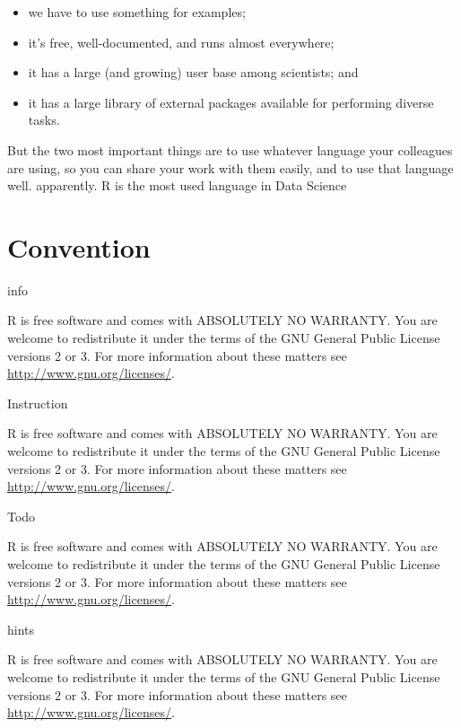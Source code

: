 \documentclass[
]{book}
\makeatletter
\providecommand{\tightlist}{%
  \setlength{\itemsep}{0pt}\setlength{\parskip}{0pt}}
\newenvironment{kframe}{%
\medskip{}
\setlength{\fboxsep}{.8em}
 \def\at@end@of@kframe{}%
 \ifinner\ifhmode%
  \def\at@end@of@kframe{\end{minipage}}%
  \begin{minipage}{\columnwidth}%
 \fi\fi%
 \def\FrameCommand##1{\hskip\@totalleftmargin \hskip-\fboxsep
 \colorbox{shadecolor}{##1}\hskip-\fboxsep
     \hskip-\linewidth \hskip-\@totalleftmargin \hskip\columnwidth}%
 \MakeFramed {\advance\hsize-\width
   \@totalleftmargin\z@ \linewidth\hsize
   \@setminipage}}%
 {\par\unskip\endMakeFramed%
 \at@end@of@kframe}
\newenvironment{rmdblock}[1]
  {
  \begin{itemize}
  \renewcommand{\labelitemi}{
    \raisebox{-.7\height}[0pt][0pt]{
      {\setkeys{Gin}{width=3em,keepaspectratio}\texttt{[image: images/\#1]}}
    }
  }
  \setlength{\fboxsep}{1em}
  \begin{kframe}
  \item
  }
  {
  \end{kframe}
  \end{itemize}
  }
\newenvironment{rmdaction}
  {\begin{rmdblock}{action}}
  {\end{rmdblock}}
\newenvironment{rmdinstruction}
  {\begin{rmdblock}{instruction}}
  {\end{rmdblock}}
\newenvironment{rmdinfo}
  {\begin{rmdblock}{info}}
  {\end{rmdblock}}
\newenvironment{rmdnote}
  {\begin{rmdblock}{note}}
  {\end{rmdblock}}
\makeatother
\begin{document}
\begin{itemize}
\tightlist
\item
  we have to use something for examples;
\item
  it's free, well-documented, and runs almost everywhere;
\item
  it has a large (and growing) user base among scientists; and
\item
  it has a large library of external packages available for performing diverse tasks.
\end{itemize}

But the two most important things are to use whatever language your colleagues are using, so you can share your work with them easily, and to use that language well. apparently. R is the most used language in Data Science

\hypertarget{convention}{%
\section{Convention}\label{convention}}

info

\begin{rmdinfo}
R is free software and comes with ABSOLUTELY NO WARRANTY.
You are welcome to redistribute it under the terms of the
GNU General Public License versions 2 or 3.
For more information about these matters see
\url{http://www.gnu.org/licenses/}.
\end{rmdinfo}
Instruction

\begin{rmdinstruction}
R is free software and comes with ABSOLUTELY NO WARRANTY.
You are welcome to redistribute it under the terms of the
GNU General Public License versions 2 or 3.
For more information about these matters see
\url{http://www.gnu.org/licenses/}.
\end{rmdinstruction}

Todo

\begin{rmdaction}
R is free software and comes with ABSOLUTELY NO WARRANTY.
You are welcome to redistribute it under the terms of the
GNU General Public License versions 2 or 3.
For more information about these matters see
\url{http://www.gnu.org/licenses/}.
\end{rmdaction}

hints

\begin{rmdnote}
R is free software and comes with ABSOLUTELY NO WARRANTY.
You are welcome to redistribute it under the terms of the
GNU General Public License versions 2 or 3.
For more information about these matters see
\url{http://www.gnu.org/licenses/}.
\end{rmdnote}
\end{document}
